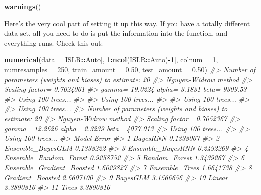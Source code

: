 \documentclass[
]{book}
\newenvironment{Shaded}{\begin{snugshade}}{\end{snugshade}}
\newcommand{\AttributeTok}[1]{\textcolor[rgb]{0.13,0.29,0.53}{#1}}
\newcommand{\CommentTok}[1]{\textcolor[rgb]{0.56,0.35,0.01}{\textit{#1}}}
\newcommand{\DecValTok}[1]{\textcolor[rgb]{0.00,0.00,0.81}{#1}}
\newcommand{\FloatTok}[1]{\textcolor[rgb]{0.00,0.00,0.81}{#1}}
\newcommand{\FunctionTok}[1]{\textcolor[rgb]{0.13,0.29,0.53}{\textbf{#1}}}
\newcommand{\NormalTok}[1]{#1}
\newcommand{\SpecialCharTok}[1]{\textcolor[rgb]{0.81,0.36,0.00}{\textbf{#1}}}
\begin{document}
\begin{Shaded}
\begin{Highlighting}[]

\FunctionTok{warnings}\NormalTok{()}
\end{Highlighting}
\end{Shaded}

Here's the very cool part of setting it up this way. If you have a
totally different data set, all you need to do is put the information
into the function, and everything runs. Check this out:

\begin{Shaded}
\begin{Highlighting}[]

\FunctionTok{numerical}\NormalTok{(}\AttributeTok{data =}\NormalTok{ ISLR}\SpecialCharTok{::}\NormalTok{Auto[, }\DecValTok{1}\SpecialCharTok{:}\FunctionTok{ncol}\NormalTok{(ISLR}\SpecialCharTok{::}\NormalTok{Auto)}\SpecialCharTok{{-}}\DecValTok{1}\NormalTok{], }\AttributeTok{colnum =} \DecValTok{1}\NormalTok{, }\AttributeTok{numresamples =} \DecValTok{250}\NormalTok{, }\AttributeTok{train\_amount =} \FloatTok{0.50}\NormalTok{, }\AttributeTok{test\_amount =} \FloatTok{0.50}\NormalTok{)}
\CommentTok{\#\textgreater{} Number of parameters (weights and biases) to estimate: 20 }
\CommentTok{\#\textgreater{} Nguyen{-}Widrow method}
\CommentTok{\#\textgreater{} Scaling factor= 0.7024061 }
\CommentTok{\#\textgreater{} gamma= 19.0224    alpha= 3.1831   beta= 9309.53}
\CommentTok{\#\textgreater{} Using 100 trees...}
\CommentTok{\#\textgreater{} }
\CommentTok{\#\textgreater{} Using 100 trees...}
\CommentTok{\#\textgreater{} }
\CommentTok{\#\textgreater{} Using 100 trees...}
\CommentTok{\#\textgreater{} }
\CommentTok{\#\textgreater{} Using 100 trees...}
\CommentTok{\#\textgreater{} Number of parameters (weights and biases) to estimate: 20 }
\CommentTok{\#\textgreater{} Nguyen{-}Widrow method}
\CommentTok{\#\textgreater{} Scaling factor= 0.7052367 }
\CommentTok{\#\textgreater{} gamma= 12.2626    alpha= 2.3239   beta= 4077.013}
\CommentTok{\#\textgreater{} Using 100 trees...}
\CommentTok{\#\textgreater{} }
\CommentTok{\#\textgreater{} Using 100 trees...}
\CommentTok{\#\textgreater{}                        Model     Error}
\CommentTok{\#\textgreater{} 1                   BayesRNN 0.1338067}
\CommentTok{\#\textgreater{} 2          Ensemble\_BayesGLM 0.1338222}
\CommentTok{\#\textgreater{} 3          Ensemble\_BayesRNN 0.2492269}
\CommentTok{\#\textgreater{} 4     Ensemble\_Random\_Forest 0.9258752}
\CommentTok{\#\textgreater{} 5              Random\_Forest 1.3439267}
\CommentTok{\#\textgreater{} 6  Ensemble\_Gradient\_Boosted 1.6029827}
\CommentTok{\#\textgreater{} 7             Ensemble\_Trees 1.6641738}
\CommentTok{\#\textgreater{} 8           Gradient\_Boosted 2.6607100}
\CommentTok{\#\textgreater{} 9                   BayesGLM 3.1566656}
\CommentTok{\#\textgreater{} 10                    Linear 3.3890816}
\CommentTok{\#\textgreater{} 11                     Trees 3.3890816}
\end{Highlighting}
\end{Shaded}
\end{document}
